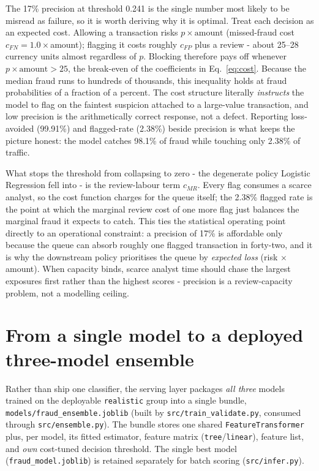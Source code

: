 \documentclass[11pt,a4paper]{report}
\newcommand{\code}[1]{\texttt{\small #1}}
\begin{document}
The 17\% precision at threshold 0.241 is the single number most likely to be misread as failure, so it is worth deriving why it is optimal. Treat each decision as an expected cost. Allowing a transaction risks $p\times\text{amount}$ (missed-fraud cost $c_{FN}=1.0\times$amount); flagging it costs roughly $c_{FP}$ plus a review - about 25--28 currency units almost regardless of $p$. Blocking therefore pays off whenever $p\times\text{amount}>25$, the break-even of the coefficients in Eq.~\eqref{eq:cost}. Because the median fraud runs to hundreds of thousands, this inequality holds at fraud probabilities of a fraction of a percent. The cost structure literally \emph{instructs} the model to flag on the faintest suspicion attached to a large-value transaction, and low precision is the arithmetically correct response, not a defect. Reporting loss-avoided (99.91\%) and flagged-rate (2.38\%) beside precision is what keeps the picture honest: the model catches 98.1\% of fraud while touching only 2.38\% of traffic.

What stops the threshold from collapsing to zero - the degenerate policy Logistic Regression fell into - is the review-labour term $c_{MR}$. Every flag consumes a scarce analyst, so the cost function charges for the queue itself; the 2.38\% flagged rate is the point at which the marginal review cost of one more flag just balances the marginal fraud it expects to catch. This ties the statistical operating point directly to an operational constraint: a precision of 17\% is affordable only because the queue can absorb roughly one flagged transaction in forty-two, and it is why the downstream policy prioritises the queue by \emph{expected loss} (risk $\times$ amount). When capacity binds, scarce analyst time should chase the largest exposures first rather than the highest scores - precision is a review-capacity problem, not a modelling ceiling.

\section{From a single model to a deployed three-model ensemble}
\label{sec:ensemble}

Rather than ship one classifier, the serving layer packages \emph{all three} models trained
on the deployable \code{realistic} group into a single bundle,
\code{models/fraud\_ensemble.joblib} (built by \code{src/train\_validate.py}, consumed
through \code{src/ensemble.py}). The bundle stores one shared \code{FeatureTransformer} plus,
per model, its fitted estimator, feature matrix (\code{tree}/\code{linear}), feature list,
and \emph{own} cost-tuned decision threshold. The single best model
(\code{fraud\_model.joblib}) is retained separately for batch scoring
(\code{src/infer.py}).
\end{document}
